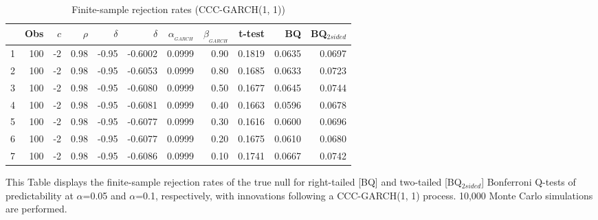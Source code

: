 \documentclass{article}
\begin{document}
\begin{table}[ht]
\centering
\caption{Finite-sample rejection rates (CCC-GARCH(1, 1)) }
\label{tab:ccc-garch}
\begin{threeparttable}
\begin{tabular}{rrrrrrrrrrr}
  \hline
 & Obs & $c$ & $\rho$ & $\delta$ &$\hat{\delta}$ & $\alpha_{_{GARCH}}$ & $\beta_{_{GARCH}}$ & t-test &BQ& BQ$_{{2sided}}$ \\ 
  \hline
1 & 100 & -2 & 0.98 & -0.95 & -0.6002 & 0.0999 & 0.90 & 0.1819 & 0.0635 & 0.0697 \\ 
  2 & 100 & -2 & 0.98 & -0.95 & -0.6053 & 0.0999 & 0.80 & 0.1685 & 0.0633 & 0.0723 \\ 
  3 & 100 & -2 & 0.98 & -0.95 & -0.6080 & 0.0999 & 0.50 & 0.1677 & 0.0645 & 0.0744 \\ 
  4 & 100 & -2 & 0.98 & -0.95 & -0.6081 & 0.0999 & 0.40 & 0.1663 & 0.0596 & 0.0678 \\ 
  5 & 100 & -2 & 0.98 & -0.95 & -0.6077 & 0.0999 & 0.30 & 0.1616 & 0.0600 & 0.0696 \\ 
  6 & 100 & -2 & 0.98 & -0.95 & -0.6077 & 0.0999 & 0.20 & 0.1675 & 0.0610 & 0.0680 \\ 
  7 & 100 & -2 & 0.98 & -0.95 & -0.6086 & 0.0999 & 0.10 & 0.1741 & 0.0667 & 0.0742 \\ 
   \hline
\end{tabular}
 \begin{tablenotes}
 \small
\item This Table displays the finite-sample rejection rates of the true null for right-tailed  [BQ] and two-tailed  [BQ$_{{2sided}}$] Bonferroni Q-tests of predictability at $\alpha$=0.05 and $\alpha$=0.1, respectively, with innovations following a CCC-GARCH(1, 1) process. 10,000 Monte Carlo simulations are performed.
\end{tablenotes}
\end{threeparttable}
\end{table}
\end{document}
